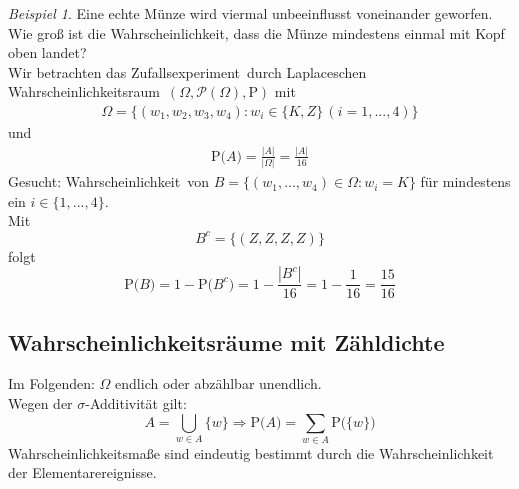 \documentclass[a4paper,12pt,fleqn]{scrartcl}
\newcommand{\m}[1]{\mathcal{ #1 }}
\newcommand{\p}[1]{\text{P(} #1 \text{)}}
\newcommand{\ZE}{Zufallsexperiment}
\newcommand{\WR}{Wahrscheinlichkeitsraum}
\newcommand{\WM}{Wahrscheinlichkeitsmaß}
\newcommand{\Wk}{Wahrscheinlichkeit}
\newcommand{\impl}{\Rightarrow}
\theoremstyle{definition}
\theoremstyle{plain}
\theoremstyle{remark}
\newtheorem{beispiel}[definition]{Beispiel}
\begin{document}
\begin{beispiel}
Eine echte Münze wird viermal unbeeinflusst voneinander geworfen. Wie groß ist die Wahrscheinlichkeit, dass die Münze mindestens einmal mit Kopf oben landet? \\
Wir betrachten das \ZE \, durch Laplaceschen \WR \, $( \Omega , \m{P}(\Omega)  , \text{P})$ mit 
\begin{align*}
\Omega = \{ (w_1, w_2, w_3, w_4) : w_i \in \{ K , Z \} \, (i = 1,...,4) \} 
\end{align*} 
und 
\begin{align*}
 \p{A} = \frac{|A|}{|\Omega|} = \frac{|A|}{16}
\end{align*}
Gesucht: \Wk \, von  $B = \{ (w_1,...,w_4) \in \Omega : w_i = K \} $ für mindestens ein $ i \in \{1,...,4 \} $. \\
Mit 
\[B^c = \{ (Z,Z,Z,Z) \} \]
folgt
\[\p{B} = 1- \p{B^c} = 1- \frac{|B^c|}{16} = 1- \frac{1}{16} = \frac{15}{16}\]
\end{beispiel}

\subsection{Wahrscheinlichkeitsräume mit Zähldichte}

Im Folgenden: $\Omega$ endlich oder abzählbar unendlich. \\
Wegen der $\sigma$-Additivität gilt:
\[A = \bigcup_{w \in A} \{w\} \impl \p{A} = \sum_{w \in A} \p{\{w\}}\]
\WM e sind eindeutig bestimmt durch die \Wk \, der Elementarereignisse.
\end{document}
